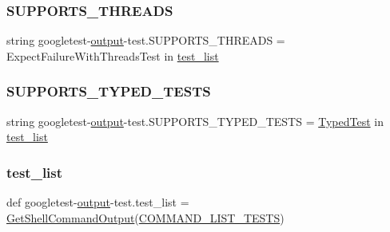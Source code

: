 \mbox{\label{namespacegoogletest-output-test_a9dd8b32109121ee9ce8a8c42130ca621}} 
\subsubsection{\texorpdfstring{SUPPORTS\_THREADS}{SUPPORTS\_THREADS}}
{\footnotesize\ttfamily string googletest-\/\mbox{\hyperlink{namespacegoogletest-output-test_ab3df9ce09186215a36c30454cf282417}{output}}-\/test.\+S\+U\+P\+P\+O\+R\+T\+S\+\_\+\+T\+H\+R\+E\+A\+DS = \textquotesingle{}Expect\+Failure\+With\+Threads\+Test\textquotesingle{} in \mbox{\hyperlink{namespacegoogletest-output-test_aa116be76cb5d1da2469f2811706bf08e}{test\+\_\+list}}}

\mbox{\label{namespacegoogletest-output-test_a20362e86a65972b4ca1d030daabb0485}} 
\subsubsection{\texorpdfstring{SUPPORTS\_TYPED\_TESTS}{SUPPORTS\_TYPED\_TESTS}}
{\footnotesize\ttfamily string googletest-\/\mbox{\hyperlink{namespacegoogletest-output-test_ab3df9ce09186215a36c30454cf282417}{output}}-\/test.\+S\+U\+P\+P\+O\+R\+T\+S\+\_\+\+T\+Y\+P\+E\+D\+\_\+\+T\+E\+S\+TS = \textquotesingle{}\mbox{\hyperlink{class_typed_test}{Typed\+Test}}\textquotesingle{} in \mbox{\hyperlink{namespacegoogletest-output-test_aa116be76cb5d1da2469f2811706bf08e}{test\+\_\+list}}}

\mbox{\label{namespacegoogletest-output-test_aa116be76cb5d1da2469f2811706bf08e}} 
\subsubsection{\texorpdfstring{test\_list}{test\_list}}
{\footnotesize\ttfamily def googletest-\/\mbox{\hyperlink{namespacegoogletest-output-test_ab3df9ce09186215a36c30454cf282417}{output}}-\/test.\+test\+\_\+list = \mbox{\hyperlink{namespacegoogletest-output-test_aba640d7d1d0c51624f079baff79a04ab}{Get\+Shell\+Command\+Output}}(\mbox{\hyperlink{namespacegoogletest-output-test_accb05a0a5c9b083723186bb6116f928f}{C\+O\+M\+M\+A\+N\+D\+\_\+\+L\+I\+S\+T\+\_\+\+T\+E\+S\+TS}})}


